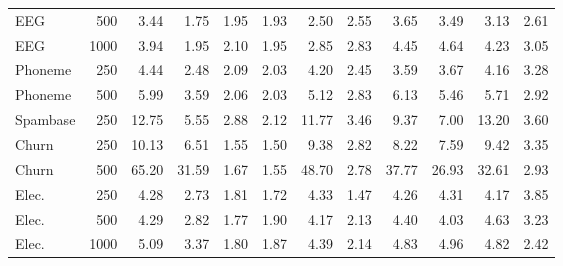 \begin{tabular}{lrrrrrrrrrrr}
EEG & 500 & 3.44 & 1.75 & 1.95 & 1.93 & 2.50 & 2.55 & 3.65 & 3.49 & 3.13 & 2.61 \\
EEG & 1000 & 3.94 & 1.95 & 2.10 & 1.95 & 2.85 & 2.83 & 4.45 & 4.64 & 4.23 & 3.05 \\
Phoneme & 250 & 4.44 & 2.48 & 2.09 & 2.03 & 4.20 & 2.45 & 3.59 & 3.67 & 4.16 & 3.28 \\
Phoneme & 500 & 5.99 & 3.59 & 2.06 & 2.03 & 5.12 & 2.83 & 6.13 & 5.46 & 5.71 & 2.92 \\
Spambase & 250 & 12.75 & 5.55 & 2.88 & 2.12 & 11.77 & 3.46 & 9.37 & 7.00 & 13.20 & 3.60 \\
Churn & 250 & 10.13 & 6.51 & 1.55 & 1.50 & 9.38 & 2.82 & 8.22 & 7.59 & 9.42 & 3.35 \\
Churn & 500 & 65.20 & 31.59 & 1.67 & 1.55 & 48.70 & 2.78 & 37.77 & 26.93 & 32.61 & 2.93 \\
Elec. & 250 & 4.28 & 2.73 & 1.81 & 1.72 & 4.33 & 1.47 & 4.26 & 4.31 & 4.17 & 3.85 \\
Elec. & 500 & 4.29 & 2.82 & 1.77 & 1.90 & 4.17 & 2.13 & 4.40 & 4.03 & 4.63 & 3.23 \\
Elec. & 1000 & 5.09 & 3.37 & 1.80 & 1.87 & 4.39 & 2.14 & 4.83 & 4.96 & 4.82 & 2.42 \\
\bottomrule
\end{tabular}
